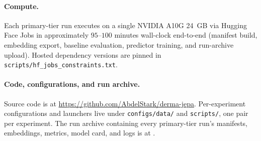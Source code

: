 \paragraph{Compute.}
Each primary-tier run executes on a single NVIDIA A10G 24~GB via Hugging Face
Jobs in approximately $95$--$100$ minutes wall-clock end-to-end (manifest build,
embedding export, baseline evaluation, predictor training, and run-archive
upload). Hosted dependency versions are pinned in
\texttt{scripts/hf\_jobs\_constraints.txt}.

\paragraph{Code, configurations, and run archive.}
Source code is at
\url{https://github.com/AbdelStark/derma-jepa}.
Per-experiment configurations and launchers live under
\texttt{configs/data/} and \texttt{scripts/}, one pair per experiment. The
run archive containing every primary-tier run's manifests, embeddings,
metrics, model card, and logs is at \runarchive.
